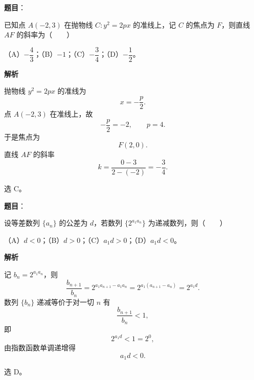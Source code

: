 \begin{answer}

\textbf{题目}：

已知点 $A(-2,3)$ 在抛物线 $C:y^2=2px$ 的准线上，记 $C$ 的焦点为 $F$，则直线 $AF$ 的斜率为\mbox{（　　）}

（A）$-\dfrac43$；（B）$-1$；（C）$-\dfrac34$；（D）$-\dfrac12$。

\textbf{解析}

抛物线 $y^2=2px$ 的准线为
\nopagebreak[4]
\[x=-\frac p2.\]
点 $A(-2,3)$ 在准线上，故
\nopagebreak[4]
\[-\frac p2=-2,\qquad p=4.\]
于是焦点为
\nopagebreak[4]
\[F(2,0).\]
直线 $AF$ 的斜率
\nopagebreak[4]
\[k=\frac{0-3}{2-(-2)}=-\frac34.\]

选 C。


\end{answer}
\begin{answer}

\textbf{题目}：

设等差数列 $\{a_n\}$ 的公差为 $d$，若数列 $\{2^{a_1a_n}\}$ 为递减数列，则\mbox{（　　）}

（A）$d<0$；（B）$d>0$；（C）$a_1d>0$；（D）$a_1d<0$。

\textbf{解析}

记 $b_n=2^{a_1a_n}$，则
\nopagebreak[4]
\[\frac{b_{n+1}}{b_n}=2^{a_1a_{n+1}-a_1a_n}=2^{a_1(a_{n+1}-a_n)}=2^{a_1d}.\]
数列 $\{b_n\}$ 递减等价于对一切 $n$ 有
\nopagebreak[4]
\[\frac{b_{n+1}}{b_n}<1,\]
即
\nopagebreak[4]
\[2^{a_1d}<1=2^0,\]
由指数函数单调递增得
\nopagebreak[4]
\[a_1d<0.\]

选 D。


\end{answer}
